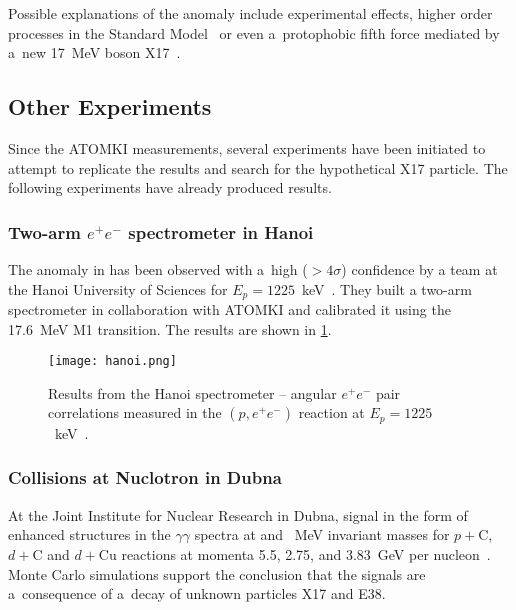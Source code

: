 				Possible explanations of the anomaly include experimental effects, higher order processes in the Standard Model~\cite{kalman,aleksejevs} or even a~protophobic fifth force mediated by a~new 17~MeV boson X17~\cite{feng}.
		\subsection{Other Experiments}
			Since the ATOMKI measurements, several experiments have been initiated to attempt to replicate the results and search for the hypothetical X17 particle. The following experiments have already produced results.
			
			\subsubsection{Two-arm $e^+e^-$ spectrometer in Hanoi}
				The anomaly in  has been observed with a~high ($>4\sigma$) confidence by a team at the Hanoi University of Sciences for $E_p = 1225$~keV~\cite{hanoi}. They built a two\nobreakdash-arm spectrometer in collaboration with ATOMKI and calibrated it using the 17.6~MeV M1 transition. The results are shown in \cref{fig:hanoi}.
				
				\begin{figure}
					\centering
					\texttt{[image: hanoi.png]}
					\caption{Results from the Hanoi spectrometer -- angular $e^+e^-$ pair correlations measured in the $(p,e^+e^-)$ reaction at $E_p = 1225$~keV~\cite{hanoi}.}
					\label{fig:hanoi}
				\end{figure}
			
			\subsubsection{Collisions at Nuclotron in Dubna}
				At the Joint Institute for Nuclear Research in Dubna, signal in the form of enhanced structures in the $\gamma\gamma$ spectra at  and ~MeV invariant masses for $p+\mathrm{C}$, $d+\mathrm{C}$ and $d+\mathrm{Cu}$ reactions at momenta 5.5, 2.75, and 3.83~GeV per nucleon~\cite{dubna}. Monte Carlo simulations support the conclusion that the signals are a~consequence of a~decay of unknown particles X17 and E38.
				
